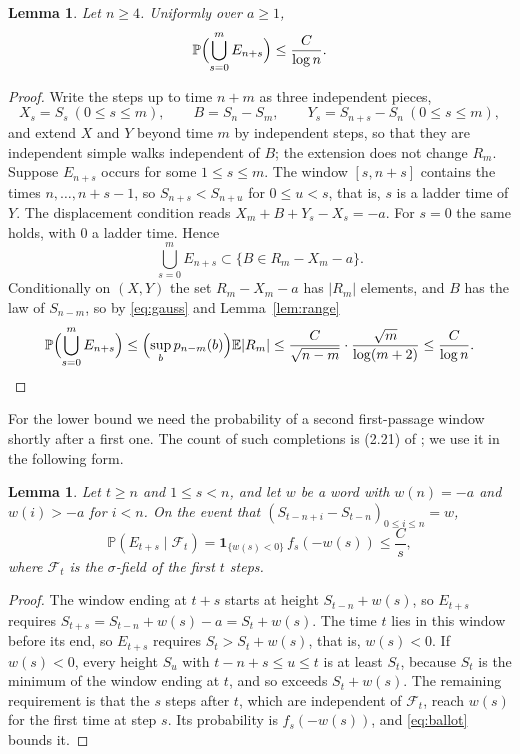 \documentclass[11pt]{amsart}
\newtheorem{lemma}[theorem]{Lemma}
\theoremstyle{remark}
\numberwithin{equation}{section}
\newcommand{\PP}{\mathbb{P}}
\newcommand{\EE}{\mathbb{E}}
\begin{document}
\begin{lemma}\label{lem:upper}
Let $n\ge4$. Uniformly over $a\ge1$,
\[
\PP\Bigl(\bigcup_{s=0}^mE_{n+s}\Bigr)\le\frac C{\log n}.
\]
\end{lemma}

\begin{proof}
Write the steps up to time $n+m$ as three independent pieces,
\[
X_s=S_s\ (0\le s\le m),\qquad B=S_n-S_m,\qquad Y_s=S_{n+s}-S_n\ (0\le s\le m),
\]
and extend $X$ and $Y$ beyond time $m$ by independent steps, so that they are independent simple walks independent of $B$; the extension does not change $R_m$. Suppose $E_{n+s}$ occurs for some $1\le s\le m$. The window $[s,n+s]$ contains the times $n,\dots,n+s-1$, so $S_{n+s}<S_{n+u}$ for $0\le u<s$, that is, $s$ is a ladder time of $Y$. The displacement condition reads $X_m+B+Y_s-X_s=-a$. For $s=0$ the same holds, with $0$ a ladder time. Hence
\[
\bigcup_{s=0}^mE_{n+s}\subset\{B\in R_m-X_m-a\}.
\]
Conditionally on $(X,Y)$ the set $R_m-X_m-a$ has $|R_m|$ elements, and $B$ has the law of $S_{n-m}$, so by \eqref{eq:gauss} and Lemma~\ref{lem:range}
\[
\PP\Bigl(\bigcup_{s=0}^mE_{n+s}\Bigr)\le\Bigl(\sup_bp_{n-m}(b)\Bigr)\EE|R_m|\le\frac C{\sqrt{n-m}}\cdot\frac{\sqrt m}{\log(m+2)}\le\frac C{\log n}.\qedhere
\]
\end{proof}

For the lower bound we need the probability of a second first-passage window shortly after a first one. The count of such completions is (2.21) of \cite{PT}; we use it in the following form.

\begin{lemma}\label{lem:overlap}
Let $t\ge n$ and $1\le s<n$, and let $w$ be a word with $w(n)=-a$ and $w(i)>-a$ for $i<n$. On the event that $(S_{t-n+i}-S_{t-n})_{0\le i\le n}=w$,
\[
\PP(E_{t+s}\mid\mathcal F_t)=\mathbf 1_{\{w(s)<0\}}\,f_s(-w(s))\le\frac Cs,
\]
where $\mathcal F_t$ is the $\sigma$-field of the first $t$ steps.
\end{lemma}

\begin{proof}
The window ending at $t+s$ starts at height $S_{t-n}+w(s)$, so $E_{t+s}$ requires $S_{t+s}=S_{t-n}+w(s)-a=S_t+w(s)$. The time $t$ lies in this window before its end, so $E_{t+s}$ requires $S_t>S_t+w(s)$, that is, $w(s)<0$. If $w(s)<0$, every height $S_u$ with $t-n+s\le u\le t$ is at least $S_t$, because $S_t$ is the minimum of the window ending at $t$, and so exceeds $S_t+w(s)$. The remaining requirement is that the $s$ steps after $t$, which are independent of $\mathcal F_t$, reach $w(s)$ for the first time at step $s$. Its probability is $f_s(-w(s))$, and \eqref{eq:ballot} bounds it.
\end{proof}
\end{document}
